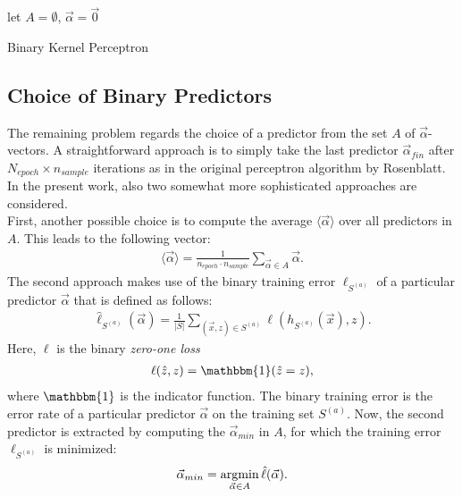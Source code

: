 \begin{algorithm}[H]
\SetAlgoLined
{}
 let $A = \emptyset$, $\vec{\alpha} = \vec{0}$\;
\caption{Binary Kernel Perceptron}
\label{alg:binary_kernel_perceptron}
\end{algorithm}

\subsection{Choice of Binary Predictors}\label{subsec:choice}

The remaining problem regards the choice of a predictor from the set $A$ of $\vec{\alpha}$-vectors. A straightforward approach is to simply take the last predictor $\vec{\alpha}_{fin}$ after $N_{epoch} \times n_{sample}$ iterations as in the original perceptron algorithm by Rosenblatt. In the present work, also two somewhat more sophisticated approaches are considered. \\ 


First, another possible choice is to compute the average $\langle \vec{\alpha} \rangle$ over all predictors in $A$. This leads to the following vector:
\begin{align*}
	\langle \vec{\alpha} \rangle = \frac{1}{n_{epoch} \cdot n_{sample}} 			\sum_{\vec{\alpha} \in A} \vec{\alpha}.
\end{align*}
The second approach makes use of the binary training error $\ell_{S^{(a)}}$ of a particular predictor $\vec{\alpha}$ that is defined as follows:
\begin{align*}
	\hat{\ell}_{S^{(a)}}(\vec{\alpha}) = \frac{1}{|S|} 										\sum_{(\vec{x}, z) \in S^{(a)}} \ell(h_{S^{(a)}}(\vec{x}), z).
\end{align*}
Here, $\ell$ is the binary \textit{zero-one loss}
\begin{align*}
	\ell(\hat{z}, z) = \mathbbm{1}(\hat{z} = z),
\end{align*}
where $\mathbbm{1}$ is the indicator function. The binary training error is the error rate of a particular predictor $\vec{\alpha}$ on the training set $S^{(a)}$. Now, the second predictor is extracted by computing the $\vec{\alpha}_{min}$ in $A$, for which the training error $\ell_{S^{(a)}}$ is minimized:
\begin{align*}
	\vec{\alpha}_{min} = \operatorname*{argmin}_{\vec{\alpha} \in A} \hat{\ell}(\vec{\alpha}).
\end{align*} 

